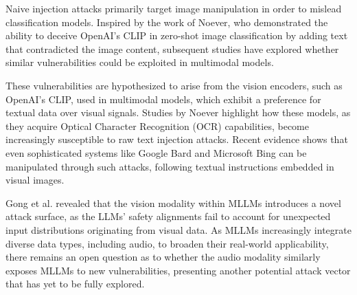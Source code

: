 Naive injection attacks primarily target image manipulation in order to mislead classification models. Inspired by the work of Noever\cite{noever2021reading}, who demonstrated the ability to deceive OpenAI’s CLIP\cite{radford2021learning} in zero-shot image classification by adding text that contradicted the image content, subsequent studies have explored whether similar vulnerabilities could be exploited in multimodal models. 

These vulnerabilities are hypothesized to arise from the vision encoders, such as OpenAI’s CLIP, used in multimodal models, which exhibit a preference for textual data over visual signals. Studies by Noever\cite{noever2021reading} highlight how these models, as they acquire Optical Character Recognition (OCR) capabilities\cite{zhang2023llavar}, become increasingly susceptible to raw text injection attacks. Recent evidence shows that even sophisticated systems like Google Bard and Microsoft Bing can be manipulated through such attacks, following textual instructions embedded in visual images\cite{shayegani2023plug}. 

Gong et al.\cite{gong2023figstep} revealed that the vision modality within MLLMs introduces a novel attack surface, as the LLMs’ safety alignments fail to account for unexpected input distributions originating from visual data. As MLLMs increasingly integrate diverse data types, including audio, to broaden their real-world applicability, there remains an open question as to whether the audio modality similarly exposes MLLMs to new vulnerabilities, presenting another potential attack vector that has yet to be fully explored.

